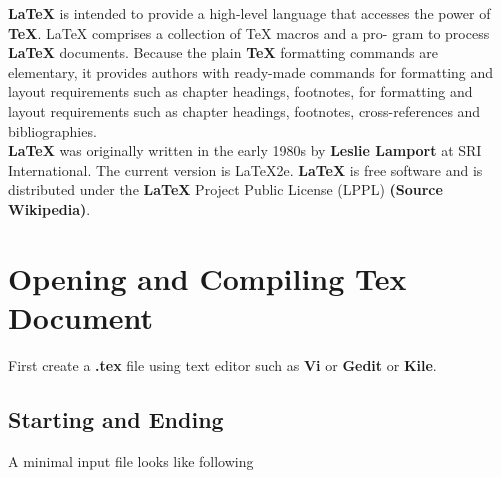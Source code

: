 \documentclass[12pt]{article}
\begin{document}
\textbf{LaTeX} is intended to provide a high-level language that accesses the
power of \textbf{TeX}. LaTeX comprises a collection of TeX macros and a pro-
gram to process \textbf{LaTeX} documents. Because the plain \textbf{TeX} formatting
commands are elementary, it provides authors with ready-made commands
for formatting and layout requirements such as chapter headings, footnotes,
for formatting and layout requirements such as chapter headings, footnotes,
cross-references and bibliographies.\\

\textbf{LaTeX} was originally written in the early 1980s by \textbf{Leslie Lamport} at
SRI International. The current version is LaTeX2e. \textbf{LaTeX} is free software
and is distributed under the \textbf{LaTeX} Project Public License (LPPL) \textbf{(Source
Wikipedia)}.

\section{Opening and Compiling Tex Document}

First create a \textbf{.tex }file using text editor such as \textbf{Vi} or \textbf{Gedit} or \textbf{Kile}.
\subsection{Starting and Ending} \label{two}

A minimal input file looks like following\\
\end{document}
